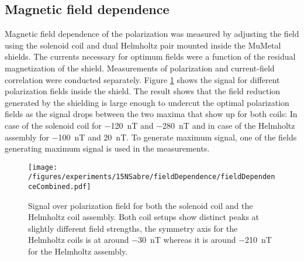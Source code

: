     \subsection{Magnetic field dependence}
    Magnetic field dependence of the polarization was measured by adjusting the field using the solenoid coil and dual Helmholtz pair mounted inside the MuMetal shields. The currents necessary for optimum fields were a function of the residual magnetization of the shield. Measurements of polarization and current-field correlation were conducted separately. Figure \ref{fig:results:15N:fieldDependence} shows the signal for different polarization fields inside the shield. The result shows that the field reduction generated by the shielding is large enough to undercut the optimal polarization fields as the signal drops between the two maxima that show up for both coils: In case of the solenoid coil for \SI{-120}{\nano\tesla} and \SI{-280}{\nano\tesla} and in case of the Helmholtz assembly for \SI{-100}{\nano\tesla} and \SI{20}{\nano\tesla}. To generate maximum signal, one of the fields generating maximum signal is used in the measurements.
        \begin{figure}
            \texttt{[image: /figures/experiments/15NSabre/fieldDependence/fieldDependenceCombined.pdf]}
            \caption[Magnetic field dependence]{Signal over polarization field for both the solenoid coil and the Helmholtz coil  assembly. Both coil setups  show distinct peaks at slightly different field strengths, the symmetry axis for the Helmholtz coils is at around \SI{-30}{\nano\tesla} whereas it is around \SI{-210}{\nano\tesla} for the Helmholtz assembly.}
            \label{fig:results:15N:fieldDependence}
        \end{figure}
